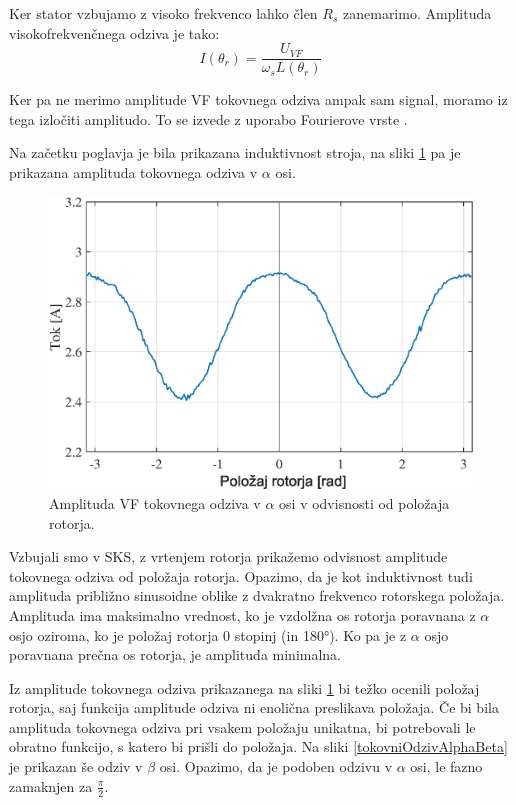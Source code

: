 \documentclass[a4paper,twoside,openright,12pt,slovene]{book}
\begin{document}
Ker stator vzbujamo z visoko frekvenco lahko člen $R_s$ zanemarimo. Amplituda visokofrekvenčnega odziva je tako:
\begin{equation}
    I(\theta_r) = \frac{U_{VF}}{\omega_sL(\theta_r)}
\end{equation}

Ker pa ne merimo amplitude VF tokovnega odziva ampak sam signal, moramo iz tega izločiti amplitudo. To se izvede z uporabo Fourierove vrste \cite{enwiki:fourierSeries}.

Na začetku poglavja je bila prikazana induktivnost stroja, na sliki \ref{tokovniOdzivAlpha} pa je prikazana amplituda tokovnega odziva v $\alpha$ osi. 

\begin{figure}[!htbp]
    \centering
    \includegraphics[width=0.9\columnwidth]{Slike/tokovniOdzivAlpha.eps}
    \caption{\label{tokovniOdzivAlpha} Amplituda VF tokovnega odziva v $\alpha$ osi v odvisnosti od položaja rotorja.}
\end{figure}

Vzbujali smo v SKS, z vrtenjem rotorja prikažemo odvisnost amplitude tokovnega odziva od položaja rotorja. Opazimo, da je kot induktivnost tudi amplituda približno sinusoidne oblike z dvakratno
frekvenco rotorskega položaja. Amplituda ima maksimalno vrednost, ko je vzdolžna os rotorja poravnana z $\alpha$ osjo oziroma, ko je položaj rotorja 0 stopinj (in 180°). Ko pa je z $\alpha$ osjo
poravnana prečna os rotorja, je amplituda minimalna.  

Iz amplitude tokovnega odziva prikazanega na sliki \ref{tokovniOdzivAlpha} bi težko ocenili položaj rotorja, saj funkcija amplitude odziva ni enolična preslikava položaja. Če bi bila amplituda
tokovnega odziva pri vsakem položaju unikatna, bi potrebovali le obratno funkcijo, s katero bi prišli do položaja. Na sliki \ref{tokovniOdzivAlphaBeta} je prikazan še odziv v $\beta$ osi. Opazimo, da
je podoben odzivu v $\alpha$ osi, le fazno zamaknjen za $\frac{\pi}{2}$. 
\end{document}
